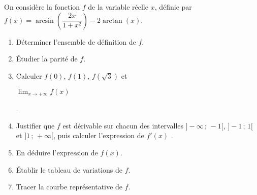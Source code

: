 
\begin{exercice}\label{exoautoanalyseCTU-45}



On considère la fonction $f$ de la variable réelle $x$, définie par $f(x)=\arcsin \left(\dfrac{2x}{1+x^2}\right)-2\arctan (x)$.
\begin{enumerate}
\item Déterminer l'ensemble de définition de $f$.
\item Étudier la parité de $f$.
\item Calculer $f(0)$, $f(1)$, $f(\sqrt{3})$ et \parbox{2 cm}{$\displaystyle\lim_{x\to+\infty}f(x)$}.
\item Justifier que $f$ est dérivable sur chacun des intervalles $]-\infty\,;\,-1[$, $]-1\,;\,1[$ et $]1\,;\,+\infty[$, puis calculer l'expression de  $f'(x)$ .
\item En déduire l'expression de $f(x)$.
\item Établir le tableau de variations de $f$.
\item Tracer la courbe représentative de $f$.
\end{enumerate}






\end{exercice}

